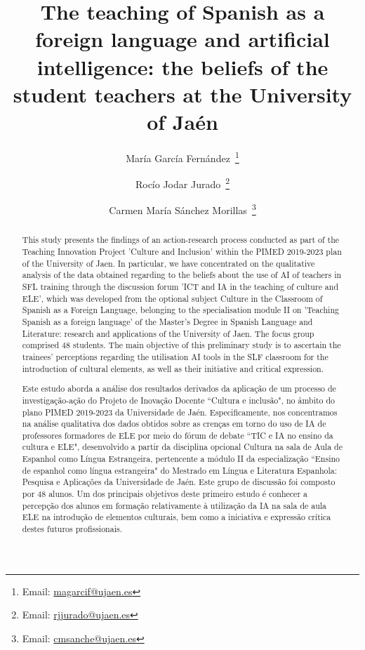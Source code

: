 \documentclass[english]{textolivre}
\title{The teaching of Spanish as a foreign language and artificial intelligence: the beliefs of the student teachers at the University of Jaén}
\author[1]{María García Fernández~\orcid{0000-0002-6437-2562}\thanks{Email: \href{mailto:magarcif@ujaen.es}{magarcif@ujaen.es}}}
\author[1]{Rocío Jodar Jurado~\orcid{0000-0002-3200-2241}\thanks{Email: \href{mailto:rjjurado@ujaen.es}{rjjurado@ujaen.es}}}
\author[1]{Carmen María Sánchez Morillas~\orcid{0000-0002-6622-212X}\thanks{Email: \href{mailto:cmsanche@ujaen.es}{cmsanche@ujaen.es}}}
\affil[1]{University of Jaén, Jaén, Spain.}
\begin{document}
\maketitle

\begin{polyabstract}
\begin{abstract}
This study presents the findings of an action-research process conducted as part of the Teaching Innovation Project 'Culture and Inclusion' within the PIMED 2019-2023 plan of the University of Jaen. In particular, we have concentrated on the qualitative analysis of the data obtained regarding to the beliefs about the use of AI of teachers in SFL training through the discussion forum 'ICT and IA in the teaching of culture and ELE', which was developed from the optional subject Culture in the Classroom of Spanish as a Foreign Language, belonging to the specialisation module II on 'Teaching Spanish as a foreign language' of the Master's Degree in Spanish Language and Literature: research and applications of the University of Jaen. The focus group comprised 48 students. The main objective of this preliminary study is to ascertain the trainees' perceptions regarding the utilisation AI tools in the SLF classroom for the introduction of cultural elements, as well as their initiative and critical expression.

\end{abstract}

\begin{portuguese}
\begin{abstract}
Este estudo aborda a análise dos resultados derivados da aplicação de um processo de investigação-ação do Projeto de Inovação Docente ``Cultura e inclusão", no âmbito do plano PIMED 2019-2023 da Universidade de Jaén. Especificamente, nos concentramos na análise qualitativa dos dados obtidos sobre as crenças em torno do uso de IA de professores formadores de ELE por meio do fórum de debate ``TIC e IA no ensino da cultura e ELE", desenvolvido a partir da disciplina opcional Cultura na sala de Aula de Espanhol como Língua Estrangeira, pertencente a módulo II da especialização ``Ensino de espanhol como língua estrangeira" do Mestrado em Língua e Literatura Espanhola: Pesquisa e Aplicações da Universidade de Jaén. Este grupo de discussão foi composto por 48 alunos. Um dos principais objetivos deste primeiro estudo é conhecer a percepção dos alunos em formação relativamente à utilização da IA na sala de aula ELE na introdução de elementos culturais, bem como a iniciativa e expressão crítica destes futuros profissionais.

\end{abstract}
\end{portuguese}
\end{polyabstract}
\end{document}
